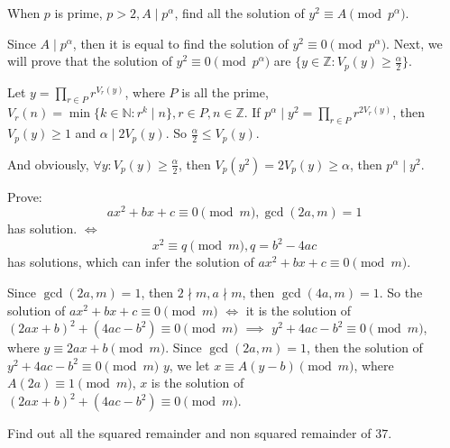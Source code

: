 \documentclass{ctexart}
\newif\ifpreface
\begin{document}
\large
\setlength{\baselineskip}{1.2em}
\ifpreface

\else
{}

\begin{problem}\label{pro:1}
  When \(p\) is prime, \(p > 2, A \mid p^\alpha\), find all the solution of \(y^2 \equiv A \pmod{p^\alpha}\).
\end{problem}
\begin{solution}
  Since \(A \mid p^{\alpha}\), then it is equal to find the solution of \(y^2 \equiv 0 \pmod{p^\alpha}\).
  Next, we will prove that the solution of \(y^2 \equiv 0 \pmod{p^\alpha}\) are \(\{y \in \mathbb{Z}: V_p(y) \geq \frac{\alpha }{2}\}\).

  Let \(y = \prod_{r \in P}r^{V_r(y)}\), where \(P\) is all the prime, \(V_r(n)=\min \{k \in \mathbb{N}:r^k \mid n \},r \in P, n \in \mathbb{Z}\).
  If \(p^\alpha \mid y^2 = \prod_{r \in P}r^{2V_r(y)}\), then \(V_p(y) \geq 1\) and \(\alpha \mid 2 V_p(y)\).
  So \(\frac{\alpha }{2}\leq V_p(y)\).

  And obviously, \(\forall y:V_p(y) \geq \frac{\alpha }{2}\), then \(V_p(y^2) =2V_p(y) \geq \alpha\), then \(p^\alpha \mid y^2\).
\end{solution}
\begin{problem}\label{pro:2}
  Prove:
  \[
    ax^2 + bx + c \equiv 0 \pmod{m},\gcd(2a,m)=1
  \]
  has solution.
  \(\iff\)
  \[
    x^2 \equiv q \pmod{m},q=b^2 -4ac
  \]
  has solutions, which can infer the solution of \(ax^2 + bx + c \equiv 0 \pmod{m}\).
\end{problem}
\begin{solution}
  Since \(\gcd(2a,m)=1\), then \(2 \nmid m, a \nmid m\), then \(\gcd(4a,m)=1\).
  So the solution of \(ax^2 + bx + c \equiv 0 \pmod{m}\) \(\iff\) it is the solution of \((2ax + b)^2 + (4ac -b^2) \equiv 0 \pmod{m}\)
  \(\implies\) \(y^2 + 4ac-b^2 \equiv 0 \pmod{m}\), where \(y \equiv 2ax + b \pmod{m}\).
  Since \(\gcd(2a,m)=1\), then the solution of \(y^2 + 4ac-b^2 \equiv 0 \pmod{m}\) \(y\), we
  let \(x \equiv A(y-b) \pmod{m}\), where \(A(2a) \equiv 1 \pmod{m}\),
  \(x\) is the solution of \((2ax + b)^2 + (4ac -b^2) \equiv 0 \pmod{m}\).

\end{solution}
\begin{problem}\label{pro:3}
Find out all the squared remainder and non squared remainder of \(37\).
\end{problem}
\end{document}
